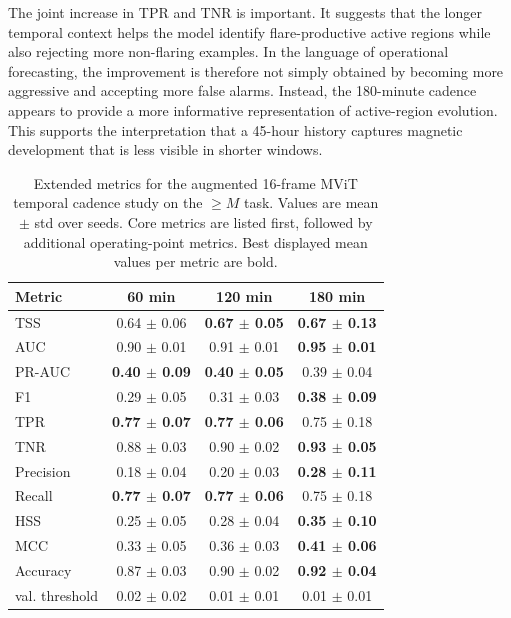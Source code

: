 The joint increase in TPR and TNR is important. It suggests that the longer temporal context helps the model identify flare-productive active regions while also rejecting more non-flaring examples. In the language of operational forecasting, the improvement is therefore not simply obtained by becoming more aggressive and accepting more false alarms. Instead, the 180-minute cadence appears to provide a more informative representation of active-region evolution. This supports the interpretation that a 45-hour history captures magnetic development that is less visible in shorter windows.

\begin{table}[!htbp]
\centering
\footnotesize
\setlength{\tabcolsep}{4pt}
\caption{Extended metrics for the augmented 16-frame MViT temporal cadence study on the $\geq M$ task. Values are mean $\pm$ std over seeds. Core metrics are listed first, followed by additional operating-point metrics. Best displayed mean values per metric are bold.}
\label{tab:appendix_video_full_m}
\begin{tabular}{lccc}
\toprule
Metric & 60 min & 120 min & 180 min \\
\midrule
TSS & 0.64 $\pm$ 0.06 & \textbf{0.67 $\pm$ 0.05} & \textbf{0.67 $\pm$ 0.13} \\
AUC & 0.90 $\pm$ 0.01 & 0.91 $\pm$ 0.01 & \textbf{0.95 $\pm$ 0.01} \\
PR-AUC & \textbf{0.40 $\pm$ 0.09} & \textbf{0.40 $\pm$ 0.05} & 0.39 $\pm$ 0.04 \\
F1 & 0.29 $\pm$ 0.05 & 0.31 $\pm$ 0.03 & \textbf{0.38 $\pm$ 0.09} \\
TPR & \textbf{0.77 $\pm$ 0.07} & \textbf{0.77 $\pm$ 0.06} & 0.75 $\pm$ 0.18 \\
TNR & 0.88 $\pm$ 0.03 & 0.90 $\pm$ 0.02 & \textbf{0.93 $\pm$ 0.05} \\
Precision & 0.18 $\pm$ 0.04 & 0.20 $\pm$ 0.03 & \textbf{0.28 $\pm$ 0.11} \\
Recall & \textbf{0.77 $\pm$ 0.07} & \textbf{0.77 $\pm$ 0.06} & 0.75 $\pm$ 0.18 \\
HSS & 0.25 $\pm$ 0.05 & 0.28 $\pm$ 0.04 & \textbf{0.35 $\pm$ 0.10} \\
MCC & 0.33 $\pm$ 0.05 & 0.36 $\pm$ 0.03 & \textbf{0.41 $\pm$ 0.06} \\
Accuracy & 0.87 $\pm$ 0.03 & 0.90 $\pm$ 0.02 & \textbf{0.92 $\pm$ 0.04} \\
val. threshold & 0.02 $\pm$ 0.02 & 0.01 $\pm$ 0.01 & 0.01 $\pm$ 0.01 \\
\bottomrule
\end{tabular}
\end{table}

